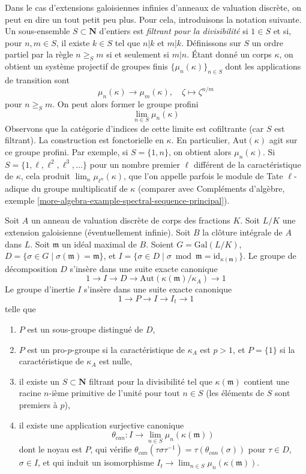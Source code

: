 \noindent
Dans le cas d'extensions galoisiennes infinies d'anneaux de valuation discrète,
on peut en dire un tout petit peu plus. Pour cela, introduisons la notation suivante.
Un sous-ensemble $S \subset \mathbf{N}$ d'entiers est {\it filtrant pour la divisibilité}
si $1 \in S$ et si, pour $n, m \in S$, il existe $k \in S$ tel que
$n | k$ et $m | k$. Définissons sur $S$ un ordre partiel par la règle
$n \geq_S m$ si et seulement si $m | n$. Étant donné un corps $\kappa$, on obtient
un système projectif de groupes finis $\{\mu_n(\kappa)\}_{n \in S}$
dont les applications de transition sont
$$
\mu_n(\kappa) \longrightarrow \mu_m(\kappa),\quad
\zeta \longmapsto \zeta^{n/m}
$$
pour $n \geq_S m$. On peut alors former le groupe profini
$$
\lim_{n \in S} \mu_n(\kappa)
$$
Observons que la catégorie d'indices de cette limite est cofiltrante (car $S$ est filtrant).
La construction est fonctorielle en $\kappa$. En particulier,
$\text{Aut}(\kappa)$ agit sur ce groupe profini.
Par exemple, si $S = \{1, n\}$, on obtient alors $\mu_n(\kappa)$.
Si $S = \{1, \ell, \ell^2, \ell^3, \ldots\}$ pour un nombre premier
$\ell$ différent de la caractéristique de $\kappa$, cela produit
$\lim_n \mu_{\ell^n}(\kappa)$,
que l'on appelle parfois le module de Tate $\ell$-adique du groupe
multiplicatif de $\kappa$ (comparer avec
Compléments d'algèbre, exemple
\ref{more-algebra-example-spectral-sequence-principal}).

\begin{lemma}
\label{lemma-structure-decomposition}
Soit $A$ un anneau de valuation discrète de corps des fractions $K$.
Soit $L/K$ une extension galoisienne (éventuellement infinie).
Soit $B$ la clôture intégrale de $A$ dans $L$.
Soit $\mathfrak m$ un idéal maximal de $B$.
Soient $G = \text{Gal}(L/K)$,
$D = \{\sigma \in G \mid \sigma(\mathfrak m) = \mathfrak m\}$, et
$I = \{\sigma \in D \mid \sigma \bmod \mathfrak m =
\text{id}_{\kappa(\mathfrak m)}\}$.
Le groupe de décomposition $D$ s'insère dans une suite exacte canonique
$$
1 \to I \to D \to \text{Aut}(\kappa(\mathfrak m)/\kappa_A) \to 1
$$
Le groupe d'inertie $I$ s'insère dans une suite exacte canonique
$$
1 \to P \to I \to I_t \to 1
$$
telle que
\begin{enumerate}
\item $P$ est un sous-groupe distingué de $D$,
\item $P$ est un pro-$p$-groupe si la caractéristique de
$\kappa_A$ est $p > 1$, et $P = \{1\}$ si la caractéristique de $\kappa_A$
est nulle,
\item il existe un $S \subset \mathbf{N}$ filtrant pour la divisibilité
tel que $\kappa(\mathfrak m)$ contient une racine $n$-ième primitive de l'unité
pour tout $n \in S$ (les éléments de $S$ sont premiers à $p$),
\item il existe une application surjective canonique
$$
\theta_{can} : I \to \lim_{n \in S} \mu_n(\kappa(\mathfrak m))
$$
dont le noyau est $P$, qui vérifie
$\theta_{can}(\tau \sigma \tau^{-1}) = \tau(\theta_{can}(\sigma))$
pour $\tau \in D$, $\sigma \in I$, et qui induit un isomorphisme
$I_t \to \lim_{n \in S} \mu_n(\kappa(\mathfrak m))$.
\end{enumerate}
\end{lemma}

